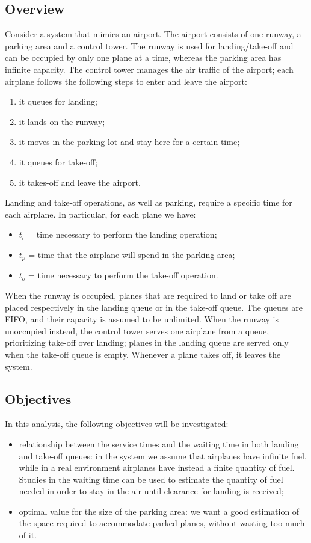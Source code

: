 \documentclass[12pt]{article}
\begin{document}
\subsection{Overview}
Consider a system that mimics an airport. The airport consists of one runway, a parking area and a control tower. The runway is used for landing/take-off and can be occupied by only one plane at a time, whereas the parking area has infinite capacity. The control tower manages the air traffic of the airport; each airplane follows the following steps to enter and leave the airport:
\begin{enumerate}
    \item it queues for landing;
    \item it lands on the runway;
    \item it moves in the parking lot and stay here for a certain time;
    \item it queues for take-off;
    \item it takes-off and leave the airport.
\end{enumerate}
Landing and take-off operations, as well as parking, require a specific time for each airplane. In particular, for each plane we have:
\begin{itemize}
    \item $t_l$ = time necessary to perform the landing operation;
	\item $t_p$ = time that the airplane will spend in the parking area;
	\item $t_o$ = time necessary to perform the take-off operation.
\end{itemize}
When the runway is occupied, planes that are required to land or take off are placed respectively in the landing queue or in the take-off queue. The queues are FIFO, and their capacity is assumed to be unlimited. When the runway is unoccupied instead, the control tower serves one airplane from a queue, prioritizing take-off over landing; planes in the landing queue are served only when the take-off queue is empty. Whenever a plane takes off, it leaves the system.

\subsection{Objectives}
In this analysis, the following objectives will be investigated:
\begin{itemize}
	\item relationship between the service times and the waiting time in both landing and take-off queues: in the system we assume that airplanes have infinite fuel, while in a real environment airplanes have instead a finite quantity of fuel. Studies in the waiting time can be used to estimate the quantity of fuel needed in order to stay in the air until clearance for landing is received;
	\item optimal value for the size of the parking area: we want a good estimation of the space required to accommodate parked planes, without wasting too much of it.
\end{itemize}
\end{document}
